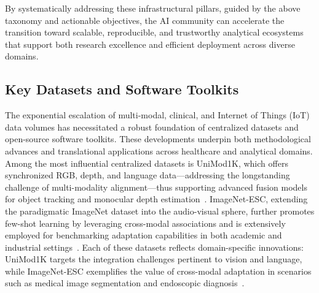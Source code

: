 \documentclass[sigconf]{acmart}
\begin{document}
By systematically addressing these infrastructural pillars, guided by the above taxonomy and actionable objectives, the AI community can accelerate the transition toward scalable, reproducible, and trustworthy analytical ecosystems that support both research excellence and efficient deployment across diverse domains.

\subsection{Key Datasets and Software Toolkits}

The exponential escalation of multi-modal, clinical, and Internet of Things (IoT) data volumes has necessitated a robust foundation of centralized datasets and open-source software toolkits. These developments underpin both methodological advances and translational applications across healthcare and analytical domains. Among the most influential centralized datasets is UniMod1K, which offers synchronized RGB, depth, and language data---addressing the longstanding challenge of multi-modality alignment---thus supporting advanced fusion models for object tracking and monocular depth estimation~\cite{ref100}. ImageNet-ESC, extending the paradigmatic ImageNet dataset into the audio-visual sphere, further promotes few-shot learning by leveraging cross-modal associations and is extensively employed for benchmarking adaptation capabilities in both academic and industrial settings~\cite{ref67,ref49}. Each of these datasets reflects domain-specific innovations: UniMod1K targets the integration challenges pertinent to vision and language, while ImageNet-ESC exemplifies the value of cross-modal adaptation in scenarios such as medical image segmentation and endoscopic diagnosis~\cite{ref67,ref49,ref43}.
\end{document}
